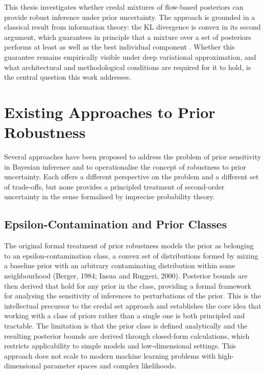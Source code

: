 This thesis investigates whether credal mixtures of flow-based posteriors 
can provide robust inference under prior uncertainty. The approach is grounded 
in a classical result from information theory: the KL divergence is convex 
in its second argument, which guarantees in principle that a mixture over a 
set of posteriors performs at least as well as the best individual component 
\citep{cover2006}. Whether this guarantee remains empirically visible 
under deep variational approximation, and what architectural and methodological 
conditions are required for it to hold, is the central question this work 
addresses.

\section{Existing Approaches to Prior Robustness}

Several approaches have been proposed to address the problem of prior 
sensitivity in Bayesian inference and to operationalise the concept of 
robustness to prior uncertainty. Each offers a different perspective on 
the problem and a different set of trade-offs, but none provides a 
principled treatment of second-order uncertainty in the sense formalised 
by imprecise probability theory.

\subsection{Epsilon-Contamination and Prior Classes}

The original formal treatment of prior robustness models the prior as 
belonging to an epsilon-contamination class, a convex set of distributions 
formed by mixing a baseline prior with an arbitrary contaminating 
distribution within some neighbourhood (Berger, 1984; Insua and Ruggeri, 
2000). Posterior bounds are then derived that hold for any prior in the 
class, providing a formal framework for analysing the sensitivity of 
inferences to perturbations of the prior. This is the intellectual 
precursor to the credal set approach and establishes the core idea that 
working with a class of priors rather than a single one is both principled 
and tractable. The limitation is that the prior class is defined 
analytically and the resulting posterior bounds are derived through 
closed-form calculations, which restricts applicability to simple models 
and low-dimensional settings. This approach does not scale to modern 
machine learning problems with high-dimensional parameter spaces and 
complex likelihoods.

